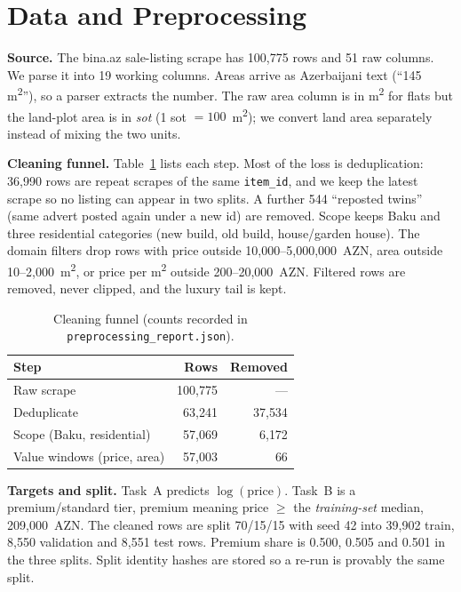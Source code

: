 \section{Data and Preprocessing}
\textbf{Source.} The bina.az sale-listing scrape has 100{,}775 rows and 51 raw columns. We parse it into 19 working columns. Areas arrive as Azerbaijani text (``145 m\texorpdfstring{\textsuperscript{2}}{2}''), so a parser extracts the number. The raw area column is in m\textsuperscript{2} for flats but the land-plot area is in \emph{sot} (1 sot $=100$~m\textsuperscript{2}); we convert land area separately instead of mixing the two units.

\textbf{Cleaning funnel.} Table~\ref{tab:funnel} lists each step. Most of the loss is deduplication: 36{,}990 rows are repeat scrapes of the same \texttt{item\_id}, and we keep the latest scrape so no listing can appear in two splits. A further 544 ``reposted twins'' (same advert posted again under a new id) are removed. Scope keeps Baku and three residential categories (new build, old build, house/garden house). The domain filters drop rows with price outside 10{,}000--5{,}000{,}000~AZN, area outside 10--2{,}000~m\textsuperscript{2}, or price per m\textsuperscript{2} outside 200--20{,}000~AZN. Filtered rows are removed, never clipped, and the luxury tail is kept.

\begin{table}[t]
  \centering
  \caption{Cleaning funnel (counts recorded in \texttt{preprocessing\_report.json}).}
  \label{tab:funnel}
  \begin{tabular}{@{}lrr@{}}
    \toprule
    Step & Rows & Removed \\
    \midrule
    Raw scrape                      & 100{,}775 & --- \\
    Deduplicate                     & 63{,}241  & 37{,}534 \\
    Scope (Baku, residential)       & 57{,}069  & 6{,}172 \\
    Value windows (price, area)  & 57{,}003 & 66 \\
    \bottomrule
  \end{tabular}
\end{table}

\textbf{Targets and split.} Task~A predicts $\log(\text{price})$. Task~B is a premium/standard tier, premium meaning price $\ge$ the \emph{training-set} median, 209{,}000~AZN. The cleaned rows are split 70/15/15 with seed 42 into 39{,}902 train, 8{,}550 validation and 8{,}551 test rows. Premium share is 0.500, 0.505 and 0.501 in the three splits. Split identity hashes are stored so a re-run is provably the same split.

